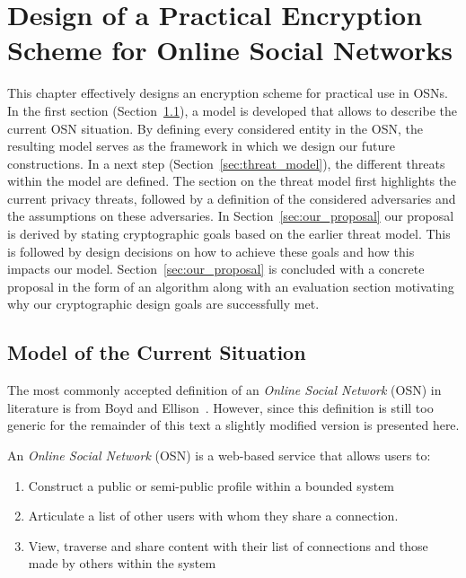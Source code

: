 \chapter{Design of a Practical Encryption Scheme for Online Social Networks}
\label{cha:n}
This chapter effectively designs an encryption scheme for practical use in OSNs. In the first section (Section~\ref{sec:model_of_current_situation}), a model is developed that allows to describe the current OSN situation. By  defining every considered entity in the OSN, the resulting model serves as the framework in which we design our future constructions. In a next step (Section~\ref{sec:threat_model}), the different threats within the model are defined. The section on the threat model first highlights the current privacy threats, followed by a definition of the considered adversaries and the assumptions on these adversaries. In Section~\ref{sec:our_proposal} our proposal is derived by stating cryptographic goals based on the earlier threat model. This is followed by design decisions on how to achieve these goals and how this impacts our model. Section~\ref{sec:our_proposal} is concluded with a concrete proposal in the form of an algorithm along with an evaluation section motivating why our cryptographic design goals are successfully met.

\section{Model of the Current Situation}
\label{sec:model_of_current_situation}
The most commonly accepted definition of an \textit{Online Social Network} (OSN) in literature is from Boyd and Ellison~\cite{art:BoydE08}. However, since this definition is still too generic for the remainder of this text a slightly modified version is presented here.

\begin{defn}
\label{def:osn_boyd}
 An \textit{Online Social Network} (OSN) is a web-based service that allows users to:
 \begin{enumerate}
  \item Construct a public or semi-public profile within a bounded system
  \item Articulate a list of other users with whom they share a connection.
  \item View, traverse and share content with their list of connections and those made by others within the system
  \setcounter{enumTemp}{\theenumi}
 \end{enumerate}
\end{defn}

